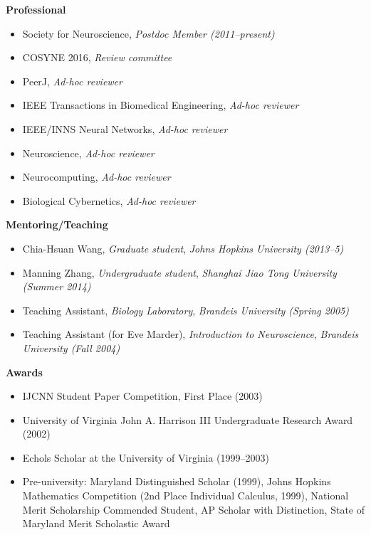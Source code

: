 \documentclass[10pt]{article}
\begin{document}
{\large \textbf{Professional}}
\begin{itemize}
  \item Society for Neuroscience, \emph{Postdoc Member (2011--present)}
  \item COSYNE 2016, \emph{Review committee}
  \item PeerJ, \emph{Ad-hoc reviewer}
  \item IEEE Transactions in Biomedical Engineering, \emph{Ad-hoc reviewer}
  \item IEEE/INNS Neural Networks, \emph{Ad-hoc reviewer}
  \item Neuroscience, \emph{Ad-hoc reviewer}
  \item Neurocomputing, \emph{Ad-hoc reviewer}
  \item Biological Cybernetics, \emph{Ad-hoc reviewer}
\end{itemize}
  
{\large \textbf{Mentoring/Teaching}}
\begin{itemize}
  \item Chia-Hsuan Wang, \emph{Graduate student}, \emph{Johns Hopkins University (2013--5)}
  \item Manning Zhang, \emph{Undergraduate student}, \emph{Shanghai Jiao Tong University (Summer 2014)}
  \item Teaching Assistant, \emph{Biology Laboratory}, \emph{Brandeis University (Spring 2005)}
  \item Teaching Assistant (for Eve Marder), \emph{Introduction to Neuroscience}, \emph{Brandeis University (Fall 2004)}
\end{itemize}


{\large \textbf{Awards}}
\begin{itemize}
  \item IJCNN Student Paper Competition, First Place (2003)
  \item University of Virginia John A. Harrison III Undergraduate Research Award (2002)
  \item Echols Scholar at the University of Virginia (1999--2003) 
  \item Pre-university: Maryland Distinguished Scholar (1999), Johns Hopkins Mathematics Competition (2nd Place Individual Calculus, 1999), National Merit Scholarship Commended Student, AP Scholar with Distinction, State of Maryland Merit Scholastic Award
\end{itemize}
\end{document}
